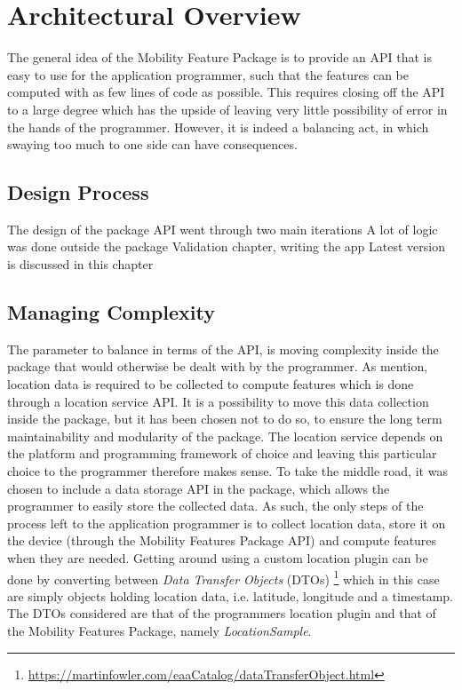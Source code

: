 \section{Architectural Overview}
The general idea of the Mobility Feature Package is to provide an API that is easy to use for the application programmer, such that the features can be computed with as few lines of code as possible. This requires closing off the API to a large degree which has the upside of leaving very little possibility of error in the hands of the programmer. However, it is indeed a balancing act, in which swaying too much to one side can have consequences. 

\subsection{Design Process}
The design of the package API went through two main iterations
A lot of logic was done outside the package
Validation chapter, writing the app
Latest version is discussed in this chapter

\subsection{Managing Complexity}
The parameter to balance in terms of the API, is moving complexity inside the package that would otherwise be dealt with by the programmer. As mention, location data is required to be collected to compute features which is done through a location service API. It is a possibility to move this data collection inside the package, but it has been chosen not to do so, to ensure the long term maintainability and modularity of the package. The location service depends on the platform and programming framework of choice and leaving this particular choice to the programmer therefore makes sense. To take the middle road, it was chosen to include a data storage API in the package, which allows the programmer to easily store the collected data. As such, the only steps of the process left to the application programmer is to collect location data, store it on the device (through the Mobility Features Package API) and compute features when they are needed. Getting around using a custom location plugin can be done by converting between \textit{Data Transfer Objects} (DTOs) \footnote{\url{https://martinfowler.com/eaaCatalog/dataTransferObject.html}} which in this case are simply objects holding location data, i.e. latitude, longitude and a timestamp. The DTOs considered are that of the programmers location plugin and that of the Mobility Features Package, namely \textit{LocationSample}.

